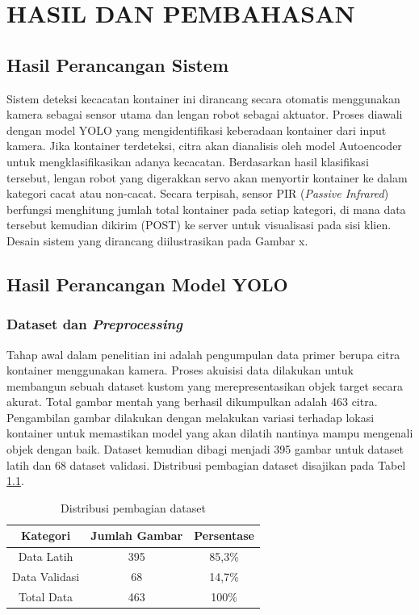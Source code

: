 \chapter{HASIL DAN PEMBAHASAN}
\section{Hasil Perancangan Sistem}
Sistem deteksi kecacatan kontainer ini dirancang secara otomatis
menggunakan kamera sebagai sensor utama dan lengan robot sebagai
aktuator. Proses diawali dengan model YOLO yang mengidentifikasi
keberadaan kontainer dari input kamera. Jika kontainer terdeteksi,
citra akan dianalisis oleh model Autoencoder untuk mengklasifikasikan
adanya kecacatan. Berdasarkan hasil klasifikasi tersebut, lengan
robot yang digerakkan servo akan menyortir kontainer ke dalam
kategori cacat atau non-cacat. Secara terpisah, sensor PIR
(\textit{Passive Infrared}) berfungsi menghitung jumlah total
kontainer pada setiap kategori, di mana data tersebut kemudian
dikirim (POST) ke server untuk visualisasi pada sisi klien. Desain
sistem yang dirancang diilustrasikan pada Gambar x.

\vspace{1em}

\section{Hasil Perancangan Model YOLO}
\subsection{Dataset dan \textit{Preprocessing}}
Tahap awal dalam penelitian ini adalah pengumpulan data primer berupa
citra kontainer menggunakan kamera. Proses akuisisi data dilakukan
untuk membangun sebuah dataset kustom yang merepresentasikan objek
target secara akurat. Total gambar mentah yang berhasil dikumpulkan
adalah 463 citra. Pengambilan gambar dilakukan dengan melakukan
variasi terhadap lokasi kontainer untuk memastikan model yang akan
dilatih nantinya mampu mengenali objek dengan baik. Dataset kemudian
dibagi menjadi 395 gambar untuk dataset latih dan 68 dataset
validasi. Distribusi pembagian dataset disajikan pada Tabel
\ref{tab:pembagian-dataset}.

\begin{table}[H]
  \caption{Distribusi pembagian dataset}
  \label{tab:pembagian-dataset}
  \vspace{-1em}
  \centering
  \begin{tabular}{ccc}
    \toprule
    \textbf{Kategori} & \textbf{Jumlah Gambar} & \textbf{Persentase} \\
    \midrule
    Data Latih & 395 & 85,3\% \\
    Data Validasi & 68 & 14,7\% \\
    Total Data & 463 & 100\% \\
    \bottomrule
  \end{tabular}
\end{table}

